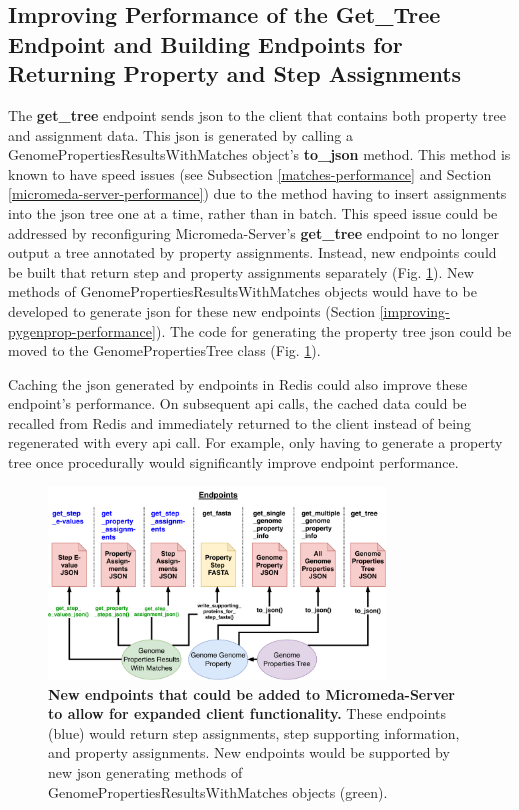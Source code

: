 \subsection{Improving Performance of the Get\_Tree Endpoint and Building 
Endpoints for Returning Property and Step Assignments} 
\label{assignment-endpoints}

The \textbf{get\_tree} endpoint sends \gls{json} to the client that contains 
both property tree and assignment data. This \gls{json} is generated by calling 
a GenomePropertiesResultsWithMatches object's \textbf{to\_json} method. This 
method is known to have speed issues (see Subsection \ref{matches-performance} 
and Section \ref{micromeda-server-performance}) due to the method having to 
insert assignments into the \gls{json} tree one at a time, rather than in batch. 
This speed issue could be addressed by reconfiguring Micromeda-Server's 
\textbf{get\_tree} endpoint to no longer output a tree annotated by property 
assignments. Instead, new endpoints could be built that return step and property 
assignments separately (Fig. \ref{fig:new_endpoints}). New methods of 
GenomePropertiesResultsWithMatches objects would have to be developed to 
generate \gls{json} for these new endpoints (Section 
\ref{improving-pygenprop-performance}). The code for generating the property 
tree \gls{json} could be moved to the GenomePropertiesTree class (Fig. 
\ref{fig:new_endpoints}).

Caching the \gls{json} generated by endpoints in Redis could also improve these 
endpoint's performance. On subsequent \gls{api} calls, the cached data could be 
recalled from Redis and immediately returned to the client instead of being 
regenerated with every \gls{api} call. For example, only having to generate a 
property tree once procedurally would significantly improve endpoint 
performance.

\begin{figure}[!ht]
  \centering
	\includegraphics[width=0.8\textwidth]{media/micromeda-server-new-endpoints.pdf}
	 \caption[New endpoints that could be added to Micromeda-Server to allow for 
expanded client functionality.]{\textbf{New endpoints that could be added to 
Micromeda-Server to allow for expanded client functionality.} These endpoints 
(blue) would return step assignments, step supporting information, and property 
assignments. New endpoints would be supported by new \gls{json} generating 
methods of GenomePropertiesResultsWithMatches objects (green).}
	 \label{fig:new_endpoints}
\end{figure}

